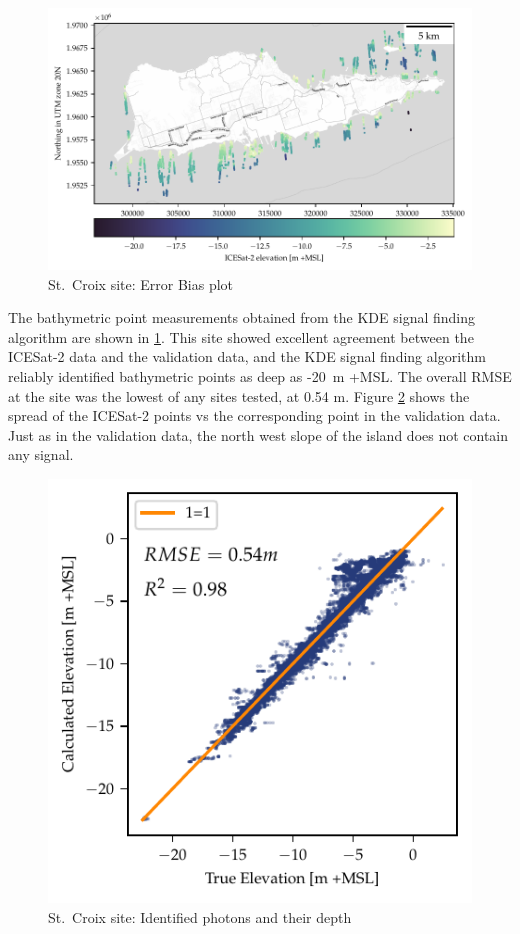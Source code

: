 \begin{figure}[htbp]
    \centering
    \includegraphics{figures/stcroix_photon_map.pdf}
    \caption{St.~Croix site: Error Bias plot}
    \label{fig:st-croix-photons}
\end{figure}

The bathymetric point measurements obtained from the KDE signal finding algorithm are shown in \ref{fig:st-croix-photons}. This site showed excellent agreement between the ICESat-2 data and the validation data, and the KDE signal finding algorithm reliably identified bathymetric points as deep as -20~m +MSL. The overall RMSE at the site was the lowest of any sites tested, at 0.54 m. Figure \ref{fig:st-croix-bias-plot} shows the spread of the ICESat-2 points vs the corresponding point in the validation data. Just as in the validation data, the north west slope of the island does not contain any signal.

\begin{figure}[htbp]
    \centering
    \includegraphics{figures/stcroix_lidar_estimated_vs_truth.pdf}
    \caption{St.~Croix site: Identified photons and their depth}
    \label{fig:st-croix-bias-plot}
\end{figure}

